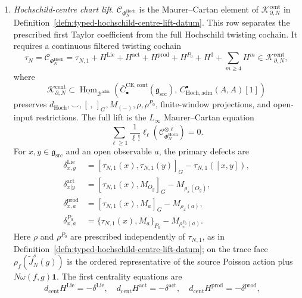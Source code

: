 \begin{defn}
\begin{enumerate}[label=\textup{(D\arabic*)}]
  \item \emph{Hochschild-centre chart lift.}
    \(\mathcal C_{\Phi_N^{\mathrm{Hoch}}}\) is the Maurer--Cartan element
    of
    \(\mathcal K^{\mathrm{cent}}_{\partial,N}\) in
    Definition~\ref{defn:typed-hochschild-centre-lift-datum}.  This row
    separates the prescribed first Taylor coefficient from the full
    Hochschild twisting cochain.  It requires a continuous filtered
    twisting cochain
    \[
      \tau_N=\mathcal C_{\Phi_N^{\mathrm{Hoch}}}
      =
      \tau_{N,1}
      +H^{\mathrm{Lie}}+H^{\mathrm{act}}
      +H^{\mathrm{prod}}+H^{P_0}+H^3+\sum_{m\ge4}H^m
      \in
      \mathcal K^{\mathrm{cent}}_{\partial,N},
    \]
    where
    \[
      \mathcal K^{\mathrm{cent}}_{\partial,N}
      \subset
      \underline{\operatorname{Hom}}_{\mathcal B^{\mathrm{adm}}}
      \!\left(
	        \overline C^{\mathrm{CE},\mathrm{cont}}_\bullet
	          (\mathfrak g_{\mathrm{src}}),\,
        C^\bullet_{\mathrm{Hoch},\mathrm{adm}}(A,A)[1]\right)
    \]
    preserves
    \(d_{\mathrm{Hoch}},\smile,[\, ,\,]_G,M_{(-)},\rho,\rho^{P_0}\),
    finite-window projections, and open-input restrictions.  The full
    lift is the \(L_\infty\) Maurer--Cartan equation
    \[
      \sum_{\ell\ge1}\frac1{\ell!}
      \ell_\ell\!\left(
        \mathcal C_{\Phi_N^{\mathrm{Hoch}}}^{\otimes \ell}\right)=0.
    \]
    For \(x,y\in\mathfrak g_{\mathrm{src}}\) and an open observable \(a\), the
    primary defects are
    \[
      \begin{aligned}
      \delta^{\mathrm{Lie}}_{x,y}
	        &=[\tau_{N,1}(x),\tau_{N,1}(y)]_G
	          -\tau_{N,1}([x,y]),\\
	      \delta^{\mathrm{act}}_{x|y}
	        &=[\tau_{N,1}(x),M_{O_y}]_G-M_{\rho_x(O_y)},\\
	      \delta^{\mathrm{prod}}_{x,a}
	        &=[\tau_{N,1}(x),M_a]_G-M_{\rho_x(a)},\\
	      \delta^{P_0}_{x,a}
	        &=\{\tau_{N,1}(x),M_a\}_{P_0}
          -M_{\rho_x^{P_0}(a)} .
      \end{aligned}
    \]
    Here \(\rho\) and \(\rho^{P_0}\) are prescribed independently of
    \(\tau_{N,1}\), as in
    Definition~\ref{defn:typed-hochschild-centre-lift-datum}; on the
    trace face \(\rho_f(\widetilde J_N^s(g))\) is the ordered
    representative of the source Poisson action plus
    \(N\omega(f,g)\mathbf1\).
    The first centrality equations are
    \[
      d_{\mathrm{cent}}H^{\mathrm{Lie}}=-\delta^{\mathrm{Lie}},\quad
      d_{\mathrm{cent}}H^{\mathrm{act}}=-\delta^{\mathrm{act}},\quad
      d_{\mathrm{cent}}H^{\mathrm{prod}}=-\delta^{\mathrm{prod}},\quad
\]
\end{enumerate}
\end{defn}
